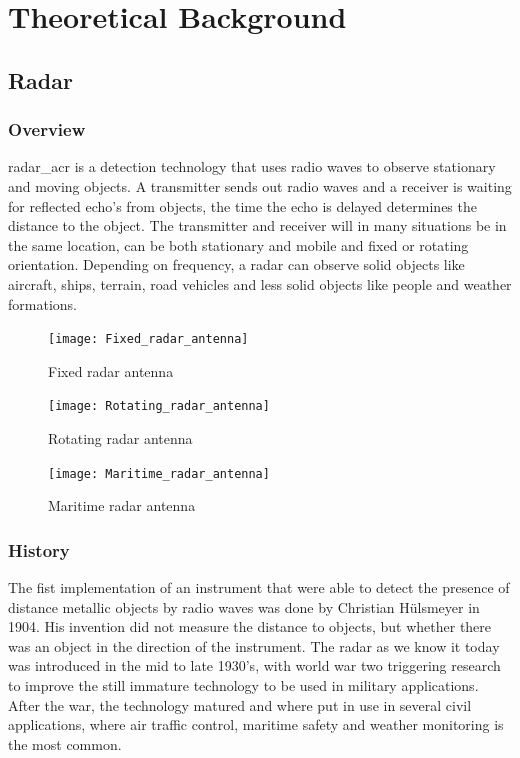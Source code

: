 
\chapter{Theoretical Background}\label{chapter:theoretical_background}
\section{Radar}
\subsection{Overview}
\gls{radar_acr} is a detection technology that uses radio waves to observe stationary and moving objects. A transmitter sends out radio waves and a receiver is waiting for reflected echo's from objects, the time the echo is delayed determines the distance to the object. The transmitter and receiver will in many situations be in the same location, can be both stationary and mobile and fixed or rotating orientation. Depending on frequency, a radar can observe solid objects like aircraft, ships, terrain, road vehicles and less solid objects like people and weather formations.
\begin{figure}
\centering
\begin{minipage}{0.3\textwidth}
\texttt{[image: Fixed\_radar\_antenna]}
\caption{Fixed radar antenna}\label{fig:fixed_radar_antenna}
\end{minipage}\hfill
\begin{minipage}{0.3\textwidth}
\texttt{[image: Rotating\_radar\_antenna]}
\caption{Rotating radar antenna}\label{fig:rotating_radar_antenna}
\end{minipage}\hfill
\begin{minipage}{0.3\textwidth}
\texttt{[image: Maritime\_radar\_antenna]}
\caption{Maritime radar antenna}\label{fig:maritime_radar_antenna}
\end{minipage}
\end{figure}

\subsection{History}
The fist implementation of an instrument that were able to detect the presence of distance metallic objects by radio waves was done by Christian Hülsmeyer in 1904. His invention did not measure the distance to objects, but whether there was an object in the direction of the instrument. The radar as we know it today was introduced in the mid to late 1930's, with world war two triggering research to improve the still immature technology to be used in military applications. After the war, the technology matured and where put in use in several civil applications, where air traffic control, maritime safety and weather monitoring is the most common.

